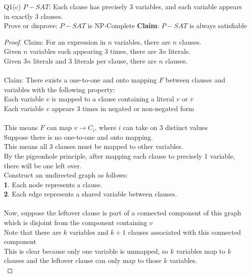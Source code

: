 \begin{problem}
    {Q1(c)}
    $P-SAT$: Each clause has precisely 3 variables, and each variable appears in exactly 3 clauses. \\
    Prove or disprove: $P-SAT$ is NP-Complete
    \textbf{Claim}: $P-SAT$ is always satisfiable
    \begin{proof}
        Claim: For an expression in $n$ variables, there are $n$ clauses. \\
        Given $n$ variables each appearing 3 times, there are $3n$ literals. \\
        Given $3n$ literals and $3$ literals per clause, there are $n$ clauses. \\\\
        Claim: There exists a one-to-one and onto mapping $F$ between clauses and variables with the following property: \\
        Each variable $v$ is mapped to a clause containing a literal $v$ or $\overline{v}$ \\
        Each variable $v$ appears $3$ times in negated or non-negated form \\\\
        This means $F$ can map $v \rightarrow C_i$, where $i$ can take on 3 distinct values \\
        Suppose there is no one-to-one and onto mapping. \\
        This means all 3 clauses must be mapped to other variables. \\
        By the pigeonhole principle, after mapping each clause to precisely 1 variable, there will be one left over. \\
        Construct an undirected graph as follows: \\
        \textbf{1}. Each node represents a clause. \\
        \textbf{2}. Each edge represents a shared variable between clauses. \\\\
        Now, suppose the leftover clause is part of a connected component of this graph which is disjoint from the component containing $v$ \\
        Note that there are $k$ variables and $k+1$ clauses associated with this connected component \\
        This is clear because only one variable is unmapped, so $k$ variables map to $k$ clauses and the leftover clause can only map to those $k$
        variables. \\

\end{proof}
\end{problem}
